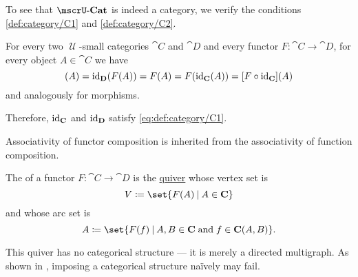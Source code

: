 \begin{defproof}
  To see that \( \ucat{Cat} \) is indeed a category, we verify the conditions \ref{def:category/C1} and \ref{def:category/C2}.

   For every two \( \mscrU \)-small categories \( \cat{C} \) and \( \cat{D} \) and every functor \( F: \cat{C} \to \cat{D} \), for every object \( A \in \cat{C} \) we have
  \begin{equation*}
    [\id_{\cat{D}} \bincirc F](A)
    =
    \id_{\cat{D}}(F(A))
    =
    F(A)
    =
    F(\id_{\cat{C}}(A))
    =
    [F \bincirc \id_{\cat{C}}](A)
  \end{equation*}
  and analogously for morphisms.

  Therefore, \( \operatorname{id}_{\operatorname{\mathbf{C}}} \) and \( \operatorname{id}_{\operatorname{\mathbf{D}}} \) satisfy \eqref{eq:def:category/C1}.

   Associativity of functor composition is inherited from the associativity of function composition.
\end{defproof}

\begin{definition}\label{def:functor_image}
  The  of a functor \( F: \cat{C} \to \cat{D} \) is the \hyperref[def:quiver]{quiver} whose vertex set is
  \begin{equation*}
    V \coloneqq \set{ F(A) \given A \in \cat{C} }
  \end{equation*}
  and whose arc set is
  \begin{equation*}
    A \coloneqq \set{ F(f) \given A, B \in \cat{C} \T{and} f \in \cat{C}(A, B) }.
  \end{equation*}

  This quiver has no categorical structure --- it is merely a directed multigraph. As shown in , imposing a categorical structure na\"ively may fail.
\end{definition}

